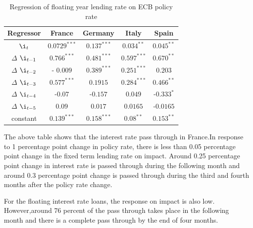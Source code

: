 \documentclass[12pt]{article}
\numberwithin{equation}{section}
\begin{document}
\begin{appendix}
\begin {table}[H]
\begin{center}
\begin{tabular}{||c c c c c||}
		\hline
			
		\end{tabular}
\end{center}
\end {table}




\begin {table}[H]
\caption {Regression of floating year lending rate on ECB policy rate} \label{tab:title} 
\begin{center}
	\begin{tabular}{||c c c c c||} 
		\hline
		Regressor &  France & Germany& Italy & Spain \\ [0.5ex] 
		\hline\hline
		$\i_{t}$ & $0.0729^{***}$& $0.137^{***}$ & $0.034^{**}$& $0.045^{**}$ \\ 
		\hline
		$\Delta$ $\i_{t-1}$& $0.766^{***}$& $0.481^{***}$& $0.597^{***}$& $0.670^{**}$ \\ 
		\hline
		$\Delta$ $\i_{t-2}$&- $0.009$ &$0.389^{***}$& $0.251^{***}$& $0.203$ \\
		
		\hline
		$\Delta$ $\i_{t-3}$	&  $0.577^{***}$ &  $0.1915$& $0.284^{***}$& $0.466^{**}$ \\
		\hline
		$\Delta$  $\i_{t-4}$&-$0.07$&-$0.157$ & $0.049$& -$0.333^{*}$ \\  
		\hline
		$\Delta$  $\i_{t-5}$&$0.09$&$0.017$ & $0.0165$& -$0.0165$ \\  
		\hline
		constant&$0.139^{***}$ &$0.158^{***}$& $0.08^{**}$ & $0.153^{**}$\\ 
		
		\hline
		
	\end{tabular}
\end{center}
\end {table}


The above table shows that the interest rate pass through in France.In response to 1 percentage point change in policy rate, there is less than 0.05 percentage point change in the fixed term lending rate on impact.  Around 0.25 percentage point change in interest rate is passed through during the following month and around 0.3 percentage point change is passed through during the third and fourth months after the policy rate change.

For the floating interest rate loans, the response on impact is also low. However,around 76 percent of the pass through takes place in the following month and there is a complete pass through by the end of four months.




\end{appendix}
\end{document}
